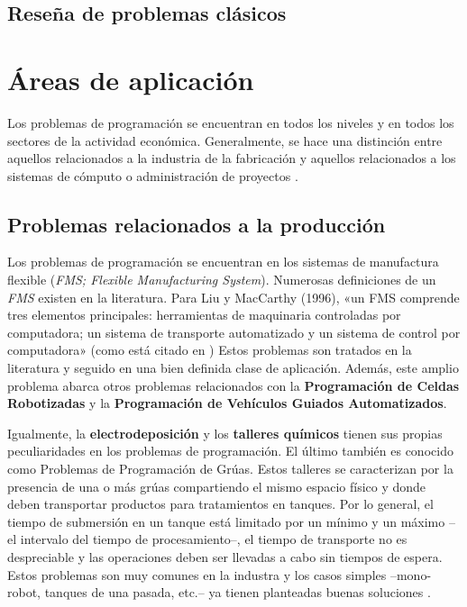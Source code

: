 \documentclass[draft,12pt,headsepline,footsepline,paper=letter]{scrreprt}
\begin{document}
\subsection{Reseña de problemas clásicos}
\label{resena_problemas_clasicos}

\section{Áreas de aplicación}
\label{areas_aplicacion}

Los problemas de programación se encuentran en todos los niveles y en todos los sectores de la actividad económica. Generalmente, se hace una distinción entre aquellos relacionados a la industria de la fabricación y aquellos relacionados a los sistemas de cómputo o administración de proyectos \citep[p.~6]{TKindt2002}.

\subsection{Problemas relacionados a la producción} %
\label{problemas_relacionados_produccion}

Los problemas de programación se encuentran en los sistemas de manufactura flexible (\textit{FMS; Flexible Manufacturing System}). Numerosas definiciones de un \textit{FMS} existen en la literatura. Para Liu y MacCarthy (1996), «un FMS comprende tres elementos principales: herramientas de maquinaria controladas por computadora; un sistema de transporte automatizado y un sistema de control por computadora» (como está citado en \citealp[p.~6]{TKindt2002})  Estos problemas son tratados en la literatura y seguido en una bien definida clase de aplicación. Además, este amplio problema abarca otros problemas relacionados con la \textbf{Programación de Celdas Robotizadas} y la \textbf{Programación de Vehículos Guiados Automatizados}.

Igualmente, la \textbf{electrodeposición} y los \textbf{talleres químicos} tienen sus propias peculiaridades en los problemas de programación. El último también es conocido como Problemas de Programación de Grúas. Estos talleres se caracterizan por la presencia de una o más grúas compartiendo el mismo espacio físico y donde deben transportar productos para tratamientos en tanques. Por lo general, el tiempo de submersión en un tanque está limitado por un mínimo y un máximo –el intervalo del tiempo de procesamiento–, el tiempo de transporte no es despreciable y las operaciones deben ser llevadas a cabo sin tiempos de espera. Estos problemas son muy comunes en la industra y los casos simples –mono-robot, tanques de una pasada, etc.– ya tienen planteadas buenas soluciones \citep[p.~6,~7]{TKindt2002}.
\end{document}
